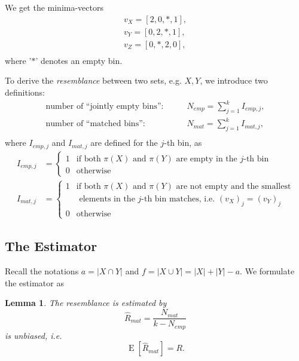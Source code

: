 \documentclass[a4paper]{article}
\DeclareMathOperator{\E}{E}
\newtheorem{mylemma}{Lemma}
\begin{document}
We get the minima-vectors
\begin{equation}
\begin{split}
v_X=[2,0,*,1],\\
v_Y=[0,2,*,1],\\
v_Z=[0,*,2,0],\\
\end{split}
\end{equation}
where '$*$' denotes an empty bin.

To derive the \emph{resemblance} between two sets, e.g. $X,Y$, we introduce two definitions:
\begin{equation} \label{eq:defEmpjMatj}
\begin{split}
\text{number of ``jointly empty bins'':} \qquad & N_{emp}=\sum_{j=1}^k I_{emp,j}, \\
\text{number of ``matched bins'':} \qquad & N_{mat}=\sum_{j=1}^k I_{mat,j},\\
\end{split}
\end{equation}
where $I_{emp,j}$ and $I_{mat,j}$ are defined for the $j$-th bin, as
\begin{equation} \label{eq:defEmpMat}
\begin{split}
  I_{emp,j} &=\begin{cases}
    1 & \text{if both $\pi(X)$ and $\pi(Y)$ are empty in the $j$-th bin} \\
    0 & \text{otherwise}
  \end{cases}\\
  I_{mat,j} &=\begin{cases}
    1 & \text{if both $\pi(X)$ and $\pi(Y)$ are not empty and the smallest} \\
      & \text { elements in the $j$-th bin matches, i.e. $(v_X)_j=(v_Y)_j$} \\
    0 & \text{otherwise}
  \end{cases}
\end{split}
\end{equation}


\subsection{The Estimator}

Recall the notations $a=|X \cap Y|$ and $f=|X \cup Y|=|X|+|Y|-a$. We formulate the estimator as 
\begin{framed}
\begin{mylemma} \label{lem:onePermutationHashing}
The \emph{resemblance} is estimated by
\begin{equation}
\hat{R}_{mat}=\frac{N_{mat}}{k-N_{emp}}
\end{equation}
is unbiased, i.e.
\begin{equation}
\E\left[\hat{R}_{mat}\right]=R.
\end{equation}
\end{mylemma}
\end{framed}
\end{document}
